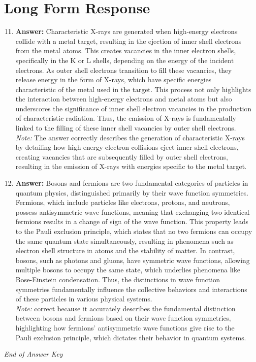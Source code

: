 \documentclass[12pt]{article}
\begin{document}
\section*{Long Form Response}
\begin{enumerate}[label=\arabic*.]
\setcounter{enumi}{10}
\item \textbf{Answer:} Characteristic X-rays are generated when high-energy electrons collide with a metal target, resulting in the ejection of inner shell electrons from the metal atoms. This creates vacancies in the inner electron shells, specifically in the K or L shells, depending on the energy of the incident electrons. As outer shell electrons transition to fill these vacancies, they release energy in the form of X-rays, which have specific energies characteristic of the metal used in the target. This process not only highlights the interaction between high-energy electrons and metal atoms but also underscores the significance of inner shell electron vacancies in the production of characteristic radiation. Thus, the emission of X-rays is fundamentally linked to the filling of these inner shell vacancies by outer shell electrons.
\\ \textit{Note:} The answer correctly describes the generation of characteristic X-rays by detailing how high-energy electron collisions eject inner shell electrons, creating vacancies that are subsequently filled by outer shell electrons, resulting in the emission of X-rays with energies specific to the metal target.
\item \textbf{Answer:} Bosons and fermions are two fundamental categories of particles in quantum physics, distinguished primarily by their wave function symmetries. Fermions, which include particles like electrons, protons, and neutrons, possess antisymmetric wave functions, meaning that exchanging two identical fermions results in a change of sign of the wave function. This property leads to the Pauli exclusion principle, which states that no two fermions can occupy the same quantum state simultaneously, resulting in phenomena such as electron shell structure in atoms and the stability of matter. In contrast, bosons, such as photons and gluons, have symmetric wave functions, allowing multiple bosons to occupy the same state, which underlies phenomena like Bose-Einstein condensation. Thus, the distinctions in wave function symmetries fundamentally influence the collective behaviors and interactions of these particles in various physical systems.
\\ \textit{Note:} correct because it accurately describes the fundamental distinction between bosons and fermions based on their wave function symmetries, highlighting how fermions' antisymmetric wave functions give rise to the Pauli exclusion principle, which dictates their behavior in quantum systems.
\end{enumerate}

\vfill
\noindent\textit{End of Answer Key}
\end{document}
